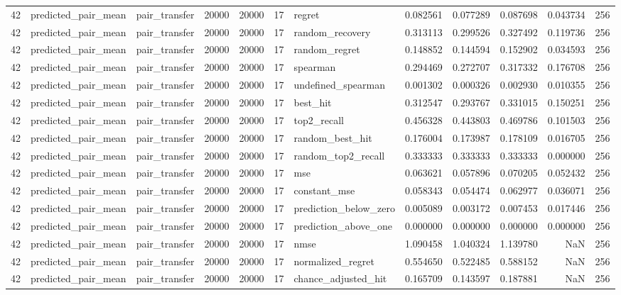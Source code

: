 \begin{tabular}{rllrrrlrrrrr}
42 & predicted_pair_mean & pair_transfer & 20000 & 20000 & 17 & regret & 0.082561 & 0.077289 & 0.087698 & 0.043734 & 256 \\
42 & predicted_pair_mean & pair_transfer & 20000 & 20000 & 17 & random_recovery & 0.313113 & 0.299526 & 0.327492 & 0.119736 & 256 \\
42 & predicted_pair_mean & pair_transfer & 20000 & 20000 & 17 & random_regret & 0.148852 & 0.144594 & 0.152902 & 0.034593 & 256 \\
42 & predicted_pair_mean & pair_transfer & 20000 & 20000 & 17 & spearman & 0.294469 & 0.272707 & 0.317332 & 0.176708 & 256 \\
42 & predicted_pair_mean & pair_transfer & 20000 & 20000 & 17 & undefined_spearman & 0.001302 & 0.000326 & 0.002930 & 0.010355 & 256 \\
42 & predicted_pair_mean & pair_transfer & 20000 & 20000 & 17 & best_hit & 0.312547 & 0.293767 & 0.331015 & 0.150251 & 256 \\
42 & predicted_pair_mean & pair_transfer & 20000 & 20000 & 17 & top2_recall & 0.456328 & 0.443803 & 0.469786 & 0.101503 & 256 \\
42 & predicted_pair_mean & pair_transfer & 20000 & 20000 & 17 & random_best_hit & 0.176004 & 0.173987 & 0.178109 & 0.016705 & 256 \\
42 & predicted_pair_mean & pair_transfer & 20000 & 20000 & 17 & random_top2_recall & 0.333333 & 0.333333 & 0.333333 & 0.000000 & 256 \\
42 & predicted_pair_mean & pair_transfer & 20000 & 20000 & 17 & mse & 0.063621 & 0.057896 & 0.070205 & 0.052432 & 256 \\
42 & predicted_pair_mean & pair_transfer & 20000 & 20000 & 17 & constant_mse & 0.058343 & 0.054474 & 0.062977 & 0.036071 & 256 \\
42 & predicted_pair_mean & pair_transfer & 20000 & 20000 & 17 & prediction_below_zero & 0.005089 & 0.003172 & 0.007453 & 0.017446 & 256 \\
42 & predicted_pair_mean & pair_transfer & 20000 & 20000 & 17 & prediction_above_one & 0.000000 & 0.000000 & 0.000000 & 0.000000 & 256 \\
42 & predicted_pair_mean & pair_transfer & 20000 & 20000 & 17 & nmse & 1.090458 & 1.040324 & 1.139780 & NaN & 256 \\
42 & predicted_pair_mean & pair_transfer & 20000 & 20000 & 17 & normalized_regret & 0.554650 & 0.522485 & 0.588152 & NaN & 256 \\
42 & predicted_pair_mean & pair_transfer & 20000 & 20000 & 17 & chance_adjusted_hit & 0.165709 & 0.143597 & 0.187881 & NaN & 256 \\

\end{tabular}
